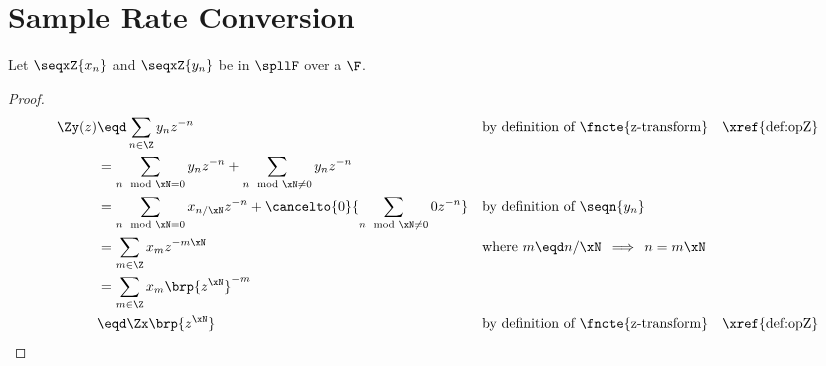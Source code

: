 
\chapter{Sample Rate Conversion}
\label{app:src}


\begin{theorem}
\label{thm:upsample}
Let $\seqxZ{x_n}$ and $\seqxZ{y_n}$ be   
in $\spllF$  over a  $\F$.
\end{theorem}
\begin{proof}
\begin{align*}
  \Zy(z)
    &\eqd \sum_{n\in\Z} y_n z^{-n}
    &&    \text{by definition of \fncte{z-transform}}
    &&    \text{\xref{def:opZ}}
  \\&=    \sum_{n\mod\xN=0}   y_n z^{-n} +
          \sum_{n\mod\xN\ne0} y_n z^{-n}
  \\&=    \sum_{n\mod\xN=0} x_{n/\xN} z^{-n} +
          \cancelto{0}{\sum_{n\mod \xN\ne 0} 0 z^{-n}}
    &&    \text{by definition of $\seqn{y_n}$}
  \\&=    \sum_{m\in\Z} x_m z^{-m\xN}
    &&    \text{where $m\eqd n/\xN\,\implies\,n=m\xN$}
  \\&=    \sum_{m\in\Z} x_m \brp{z^\xN}^{-m}
  \\&\eqd \Zx\brp{z^\xN}
    &&    \text{by definition of \fncte{z-transform}}
    &&    \text{\xref{def:opZ}}
\end{align*}
\end{proof}



